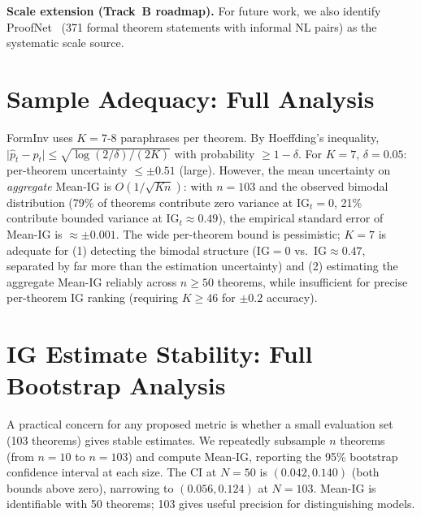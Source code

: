 \documentclass{article}
\begin{document}
\textbf{Scale extension (Track~B roadmap).}
For future work, we also identify ProofNet~\citep{azerbayev2023proofnet}
(371 formal theorem statements with informal NL pairs) as the systematic scale source.

\section{Sample Adequacy: Full Analysis}
\label{app:sampleadequacy}

FormInv uses $K = 7$-$8$ paraphrases per theorem.
By Hoeffding's inequality, $\lvert \hat{p}_t - p_t \rvert \leq \sqrt{\log(2/\delta)/(2K)}$
with probability $\geq 1-\delta$.
For $K=7$, $\delta = 0.05$: per-theorem uncertainty $\leq \pm 0.51$ (large).
However, the mean uncertainty on \emph{aggregate} Mean-IG
is $O(1/\sqrt{Kn})$: with $n=103$ and the observed bimodal distribution
(79\% of theorems contribute zero variance at $\mathrm{IG}_t = 0$,
21\% contribute bounded variance at $\mathrm{IG}_t \approx 0.49$),
the empirical standard error of Mean-IG is $\approx \pm 0.001$.
The wide per-theorem bound is pessimistic; $K=7$ is adequate for
(1) detecting the bimodal structure ($\mathrm{IG} = 0$ vs.\ $\mathrm{IG} \approx 0.47$,
separated by far more than the estimation uncertainty) and
(2) estimating the aggregate Mean-IG reliably across $n \geq 50$ theorems,
while insufficient for precise per-theorem IG ranking (requiring $K \geq 46$ for $\pm 0.2$ accuracy).

\section{IG Estimate Stability: Full Bootstrap Analysis}
\label{app:igstability}

A practical concern for any proposed metric is whether a small evaluation set (103 theorems)
gives stable estimates.
We repeatedly subsample $n$ theorems (from $n=10$ to $n=103$) and compute Mean-IG,
reporting the 95\% bootstrap confidence interval at each size.
The CI at $N=50$ is $(0.042, 0.140)$ (both bounds above zero),
narrowing to $(0.056, 0.124)$ at $N=103$.
Mean-IG is identifiable with 50 theorems; 103 gives useful precision for distinguishing models.
\end{document}

